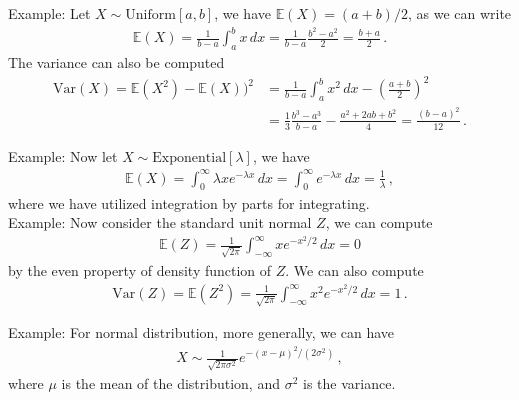 \documentclass[11pt, onesided]{book}
\theoremstyle{break}
\theoremstyle{break}
\newcommand{\example}{\color{green}Example: \color{black}}
\begin{document}
\example Let $X\sim \text{Uniform}[a,b]$, we have $\mathbb{E}(X) = (a+b)/2$, as we can write
\begin{align*}
\mathbb{E}(X) = \frac{1}{b-a}\int_a^b x\, dx = \frac{1}{b-a} \frac{b^2 - a^2}{2} = \frac{b+a}{2}\,.
\end{align*}
The variance can also be computed
\begin{align*}
\text{Var}(X) = \mathbb{E}(X^2) - \mathbb{E}(X))^2 
&= \frac{1}{b-a}\int_a^b x^2\, dx- \left( \frac{a+b}{2}\right)^2\,\\
&= \frac{1}{3} \frac{b^3 - a^3}{b-a} - \frac{a^2 +2ab + b^2}{4} = \frac{(b-a)^2}{12}\,.
\end{align*}



\example Now let $X\sim \text{Exponential}[\lambda]$, we have
\begin{align*}
\mathbb{E}(X) = \int_0^\infty \lambda xe^{-\lambda x}\, dx = \int_0^\infty e^{-\lambda x}\, dx = \frac{1}{\lambda}\,,
\end{align*}
where we have utilized integration by parts for integrating. \\


\example Now consider the standard unit normal $Z$, we can compute
\begin{align*}
\mathbb{E}(Z) = \frac{1}{\sqrt{2\pi}}\int_{-\infty}^\infty x e^{-x^2/2}\, dx = 0
\end{align*}
by the even property of density function of $Z$. We can also compute
\begin{align*}
\text{Var}(Z) = \mathbb{E}(Z^2) = \frac{1}{\sqrt{2\pi}}\int_{-\infty}^\infty x^2 e^{-x^2/2}\, dx = 1\,.
\end{align*}


\example For normal distribution, more generally, we can have
\begin{align*}
X\sim \frac{1}{\sqrt{2\pi \sigma^2}}e^{-(x-\mu)^2/(2\sigma^2)}\,,
\end{align*}
where $\mu$ is the mean of the distribution, and $\sigma^2$ is the variance. \\
\end{document}
